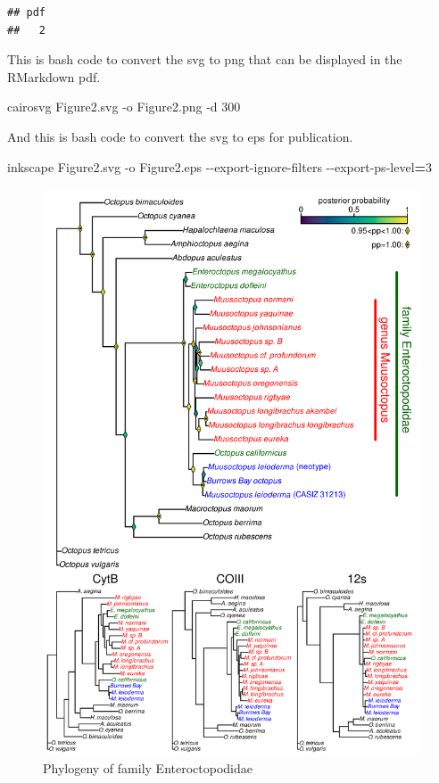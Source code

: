 \documentclass[
]{article}
\newenvironment{Shaded}{\begin{snugshade}}{\end{snugshade}}
\newcommand{\AttributeTok}[1]{\textcolor[rgb]{0.77,0.63,0.00}{#1}}
\newcommand{\ExtensionTok}[1]{#1}
\newcommand{\NormalTok}[1]{#1}
\newcommand{\OperatorTok}[1]{\textcolor[rgb]{0.81,0.36,0.00}{\textbf{#1}}}
\begin{document}
\begin{verbatim}
## pdf 
##   2
\end{verbatim}

This is bash code to convert the svg to png that can be displayed in the
RMarkdown pdf.

\begin{Shaded}
\begin{Highlighting}[]
\ExtensionTok{cairosvg}\NormalTok{ Figure2.svg }\AttributeTok{{-}o}\NormalTok{ Figure2.png }\AttributeTok{{-}d}\NormalTok{ 300}
\end{Highlighting}
\end{Shaded}

And this is bash code to convert the svg to eps for publication.

\begin{Shaded}
\begin{Highlighting}[]
\ExtensionTok{inkscape}\NormalTok{ Figure2.svg }\AttributeTok{{-}o}\NormalTok{ Figure2.eps }\AttributeTok{{-}{-}export{-}ignore{-}filters} \AttributeTok{{-}{-}export{-}ps{-}level}\OperatorTok{=}\NormalTok{3}
\end{Highlighting}
\end{Shaded}

\begin{figure}
\centering
\includegraphics{Figure2.png}
\caption{Phylogeny of family Enteroctopodidae}
\end{figure}
\end{document}
